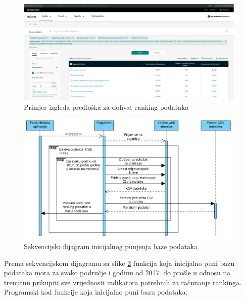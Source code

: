 \documentclass[times, utf8, zavrsni]{fer}
\begin{document}
\begin{figure}[htb]
        \hspace*{-2cm} 
           \includegraphics[scale=0.21]{predlozak.png} 
           \caption{Primjer izgleda predloška za dohvat ranking podataka}
           \label{fig:predlozak}
           \end{figure}  
           \FloatBarrier      
\begin{figure}[htb]
    \centering
       \includegraphics[scale=0.28]{sekvencijski.png} 
       \caption{Sekvencijski dijagram inicijalnog punjenja baze podataka}
       \label{fig:sekvencijski}
       \end{figure}
Prema sekvencijskom dijagramu sa slike \ref{fig:sekvencijski} funkcija koja inicijalno puni bazu podataka mora za svako područje i
godinu od 2017. do prošle u odnosu na trenutnu prikupiti sve vrijednosti indikatora potrebnih za računanje rankinga.  
\\Programski kod funkcije koja inicijalno puni bazu podataka:        
\end{document}
